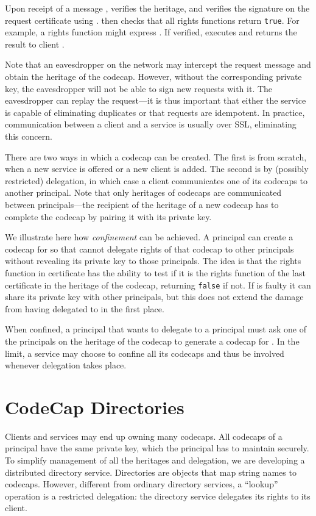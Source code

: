 \documentclass[10pt, conference, compsocconf]{IEEEtran}
\begin{document}
Upon receipt of a message , 
verifies the heritage, and verifies the signature on the request
certificate using .
 then checks that all rights functions
 return \texttt{true}.
For example, a rights function might express
.
If verified, 
executes 
and returns the result to client .

Note that an eavesdropper on the network may intercept the request
message and obtain the heritage of the codecap.  However, without the
corresponding private key, the eavesdropper will not be able to
sign new requests with it.
The eavesdropper can replay the request---it is thus important that
either the service is capable
of eliminating duplicates or that requests are idempotent.
In practice, communication between a client and a service is
usually over SSL, eliminating this concern.

There are two ways in which a codecap can be created.
The first is from scratch, when a new service is offered or a new
client is added. The
second is by (possibly restricted) delegation, in which
case a client communicates one of its codecaps to another principal.
Note that only heritages of codecaps are communicated between
principals---the recipient of the heritage of a new codecap has to 
complete the codecap by pairing it with its private key.



We illustrate here how \emph{confinement} can be achieved. 
A principal  can create a codecap for  so that
 cannot delegate rights of that codecap to other
principals without revealing its private key to those principals.
The idea is that the rights function in certificate  has the
ability to test if it is the rights function of the last certificate
in the heritage of the codecap, returning \texttt{false} if not.
If  is faulty it can share its private key with other
principals, but this does not extend the damage from having delegated to
 in the first place.

When confined, a principal  that wants to delegate to a principal
 must ask one of the principals on the heritage of the codecap
to generate a codecap for .  In the limit, a service may choose
to confine all its codecaps and thus be involved whenever delegation
takes place.

\section{CodeCap Directories}

Clients and services may end up owning many codecaps.
All codecaps of a principal have the same private key, which the
principal has to maintain securely.
To simplify management of all the heritages and delegation,
we are developing a distributed directory service.
Directories are objects that map string names to codecaps.
However, different from ordinary directory services, a ``lookup''
operation is a restricted delegation:
the directory service delegates its rights to its client.
\end{document}
